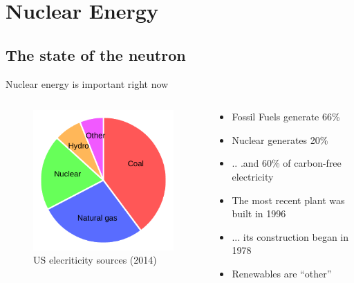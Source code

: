 \documentclass{beamer}
\begin{document}
\section{Nuclear Energy}

\subsection{The state of the neutron}

    \begin{frame}{Nuclear energy is important right now}

        \begin{columns}[T]

            \begin{column}{0.5\textwidth}
                \begin{figure}
                    \centering
                    \includegraphics{./img/sources.pdf}
                    \caption*{US elecriticity sources (2014)}
                \end{figure}
            \end{column}

            \begin{column}{0.5\textwidth}
                \begin{itemize}
                    \item Fossil Fuels generate 66\%
                    \pause
                    \item Nuclear generates 20\%
                    \pause
                    \item .. .and 60\% of carbon-free electricity
                    \pause
                    \item The most recent plant was built in 1996
                    \pause
                    \item ... its construction began in 1978
                    \pause
                    \item Renewables are ``other''
                \end{itemize}
            \end{column}

        \end{columns}

    \end{frame}
\end{document}
